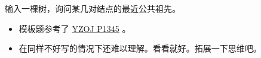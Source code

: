 \noindent 输入一棵树，询问某几对结点的最近公共祖先。

\begin{itemize}
    \item 模板题参考了 \href{https://oiproxy.bugminer.top/OnlineJudge/problem_show.php?id=1345}{YZOJ P1345} 。
    \item 在同样不好写的情况下还难以理解。看看就好。拓展一下思维吧。
\end{itemize}